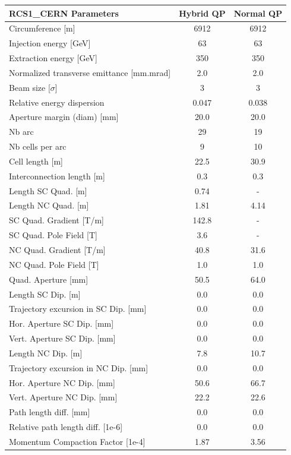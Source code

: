 \begin{tabular}{lcc}
\toprule
RCS1_CERN Parameters & Hybrid QP & Normal QP \\
\midrule
Circumference [m] & 6912 & 6912 \\
Injection energy [GeV] & 63 & 63 \\
Extraction energy [GeV] & 350 & 350 \\
Normalized transverse emittance [mm.mrad] & 2.0 & 2.0 \\
Beam size [$\sigma$] & 3 & 3 \\
Relative energy dispersion & 0.047 & 0.038 \\
Aperture margin (diam) [mm] & 20.0 & 20.0 \\
Nb arc & 29 & 19 \\
Nb cells per arc & 9 & 10 \\
Cell length [m] & 22.5 & 30.9 \\
Interconnection length [m] & 0.3 & 0.3 \\
Length SC Quad. [m] & 0.74 & - \\
Length NC Quad. [m] & 1.81 & 4.14 \\
SC Quad. Gradient [T/m] & 142.8 & - \\
SC Quad. Pole Field [T] & 3.6 & - \\
NC Quad. Gradient [T/m] & 40.8 & 31.6 \\
NC Quad. Pole Field [T] & 1.0 & 1.0 \\
Quad. Aperture [mm] & 50.5 & 64.0 \\
Length SC Dip. [m] & 0.0 & 0.0 \\
Trajectory excursion in SC Dip. [mm] & 0.0 & 0.0 \\
Hor. Aperture SC Dip. [mm] & 0.0 & 0.0 \\
Vert. Aperture SC Dip. [mm] & 0.0 & 0.0 \\
Length NC Dip. [m] & 7.8 & 10.7 \\
Trajectory excursion in NC Dip. [mm] & 0.0 & 0.0 \\
Hor. Aperture NC Dip. [mm] & 50.6 & 66.7 \\
Vert. Aperture NC Dip. [mm] & 22.2 & 22.6 \\
Path length diff. [mm] & 0.0 & 0.0 \\
Relative path length diff. [1e-6] & 0.0 & 0.0 \\
Momentum Compaction Factor [1e-4] & 1.87 & 3.56 \\
\bottomrule
\end{tabular}
